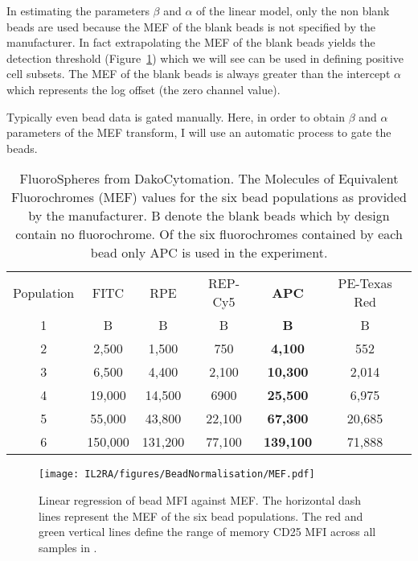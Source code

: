 In estimating the parameters $\beta$ and $\alpha$ of the linear model, only the non blank beads are used because the MEF of the blank beads is not specified by the manufacturer.
In fact extrapolating the MEF of the blank beads yields the detection threshold (Figure~\ref{figure:mef}) which we will see can be used in defining positive cell subsets.
The MEF of the blank beads is always greater than the intercept $\alpha$  which represents the log offset (the zero channel value).

Typically even bead data is gated manually.
Here, in order to obtain $\beta$ and $\alpha$ parameters of the MEF transform, I will use an automatic process to gate the beads.

\begin{table} [hb]
\begin{center}
\begin{tabular} {|c c c c c c|}
\cline{1-6}
Population & FITC & RPE & REP-Cy5 & \textbf{APC} & PE-Texas Red\\
\cline{1-6}
1 & B & B & B & \textbf{B} & B \\
2 & 2,500 & 1,500 & 750 & \textbf{4,100} & 552\\
3 & 6,500 & 4,400 & 2,100 & \textbf{10,300} & 2,014\\
4 & 19,000 & 14,500 & 6900 & \textbf{25,500} & 6,975\\
5 & 55,000 & 43,800 & 22,100 & \textbf{67,300} & 20,685\\
6 & 150,000 & 131,200 & 77,100 & \textbf{139,100} & 71,888\\
\cline{1-6}
\end{tabular}
\end{center}
\caption{ \label{table:fluorospheres} FluoroSpheres from DakoCytomation. 
    The Molecules of Equivalent Fluorochromes (MEF) values for the six bead populations as provided by the manufacturer.
    B denote the blank beads which by design contain no fluorochrome.
    Of the six fluorochromes contained by each bead only APC is used in the experiment.
 }
\end{table}

\begin{figure}[hb]
    \centering
    \texttt{[image: IL2RA/figures/BeadNormalisation/MEF.pdf]}
    \caption{ Linear regression of bead MFI against MEF. The horizontal dash lines represent the MEF of the six bead populations.
    The red and green vertical lines define the range of memory CD25 MFI across all samples in \citet{Dendrou:2009dv}. }
    \label{figure:mef}
\end{figure}



